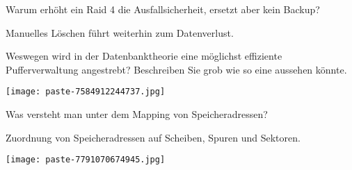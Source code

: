 \documentclass{article}
\begin{document}
\begin{tcolorbox}[colback=white!10!white,colframe=lightgray!75!black,
  savelowerto=\jobname_ex.tex]

\begin{center}
 Warum erhöht ein Raid 4 die Ausfallsicherheit, ersetzt aber kein Backup? 

\end{center}

\tcblower

\justifying
Manuelles Löschen führt weiterhin zum Datenverlust.

\end{tcolorbox}
\begin{tcolorbox}[colback=white!10!white,colframe=lightgray!75!black,
  savelowerto=\jobname_ex.tex]

\begin{center}
 Weswegen wird in der Datenbanktheorie eine möglichst effiziente Pufferverwaltung angestrebt? Beschreiben Sie grob wie so eine aussehen könnte. 

\end{center}

\tcblower

\justifying
\texttt{[image: paste-7584912244737.jpg]}

\end{tcolorbox}
\begin{tcolorbox}[colback=white!10!white,colframe=lightgray!75!black,
  savelowerto=\jobname_ex.tex]

\begin{center}
 Was versteht man unter dem 
Mapping
von Speicheradressen? 

\end{center}

\tcblower

\justifying
Zuordnung von Speicheradressen auf Scheiben, Spuren und Sektoren.

\end{tcolorbox}
\begin{tcolorbox}[colback=white!10!white,colframe=lightgray!75!black,
  savelowerto=\jobname_ex.tex]

\begin{center}
\texttt{[image: paste-7791070674945.jpg]}

\end{center}

\tcblower

\justifying

\end{tcolorbox}
\end{document}

